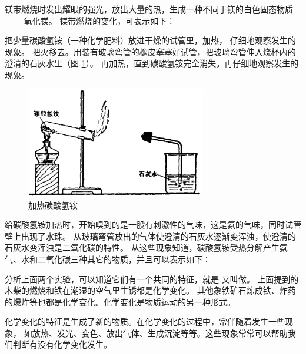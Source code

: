 镁带燃烧时发出耀眼的强光，放出大量的热，生成一种不同于镁的白色固态物质 —— 氧化镁。
镁带燃烧的变化，可表示如下：
\begin{fangchengshi}
\end{fangchengshi}

\begin{shiyan}
把少量碳酸氢铵（一种化学肥料）放进干燥的试管里，加热， 仔细地观察发生的现象。
把火移去。用装有玻璃弯管的橡皮塞塞好试管，把玻璃弯管伸入烧杯内的澄清的石灰水里（图 \ref{fig:xy-2}）。
再加热，直到碳酸氢铵完全消失。再仔细地观察发生的现象。
\end{shiyan}

\begin{figure}[htbp]
    \centering
    \includegraphics[width=0.7\textwidth]{../pic/czhx1-xy-2}
    \caption{加热碳酸氢铵}\label{fig:xy-2}
\end{figure}

给碳酸氢铵加热时，开始嗅到的是一股有刺激性的气味，这是氨的气味，同时试管壁上出现了水珠。
从玻璃弯管放出的气体使澄清的石灰水逐渐变浑浊，使澄清的石灰水变浑浊是二氧化碳的特性。
从这些现象知道，碳酸氢铵受热分解产生氨气、水和二氧化碳三种其它的物质，并且可以表示如下：
\begin{fangchengshi}
\end{fangchengshi}

\endgroup

分析上面两个实验，可以知道它们有一个共同的特征，就是
又叫做。
上面提到的木柴的燃烧和铁在潮湿的空气里生锈都是化学变化。
其他象铁矿石炼成铁、炸药的爆炸等也都是化学变化。化学变化是物质运动的另一种形式。

化学变化的特征是生成了新的物质。在化学变化的过程中，常伴随着发生一些现象，
如放热、发光、变色、放出气体、生成沉淀等等。这些现象常常可以帮助我们判断有没有化学变化发生。

